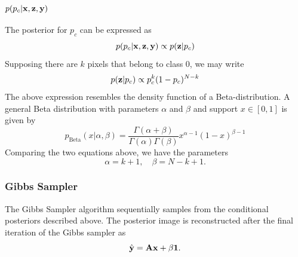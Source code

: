 \documentclass[a4paper,10pt]{article}
\def\bA{{\bf A}}
\def\bx{{\bf x}}
\def\by{{\bf y}}
\def\bz{{\bf z}}
\begin{document}
\subsubsection{$p(p_c | \bx, \bz, \by)$}
The posterior for $p_c$ can be expressed as
\begin{equation}
 p(p_c | \bx, \bz, \by) \propto p(\bz | p_c)
\end{equation}
Supposing there are $k$ pixels that belong to class 0, we may write
\begin{equation}
 p(\bz | p_c) \propto p_c^k (1 - p_c)^{N-k}
\end{equation}
The above expression resembles the density function of a Beta-distribution. A general Beta distribution with parameters $\alpha$ and $\beta$ and support $x \in [0,1]$ is given by
\begin{equation}
 p_{\mathrm{Beta}}(x|\alpha,\beta) = \frac{\Gamma(\alpha+\beta)}{\Gamma(\alpha) \Gamma(\beta)} x^{\alpha-1} (1-x)^{\beta-1}
\end{equation}
Comparing the two equations above, we have the parameters
\begin{equation}
 \alpha = k + 1, \quad \beta = N-k+1.
\end{equation}

\subsubsection{Gibbs Sampler}
The Gibbs Sampler algorithm sequentially samples from the conditional posteriors described above. The posterior image is reconstructed after the final iteration of the Gibbs sampler as
\begin{equation}
 \hat \by = \bA \bx + \beta \mathbf{1}.
\end{equation}
\end{document}
